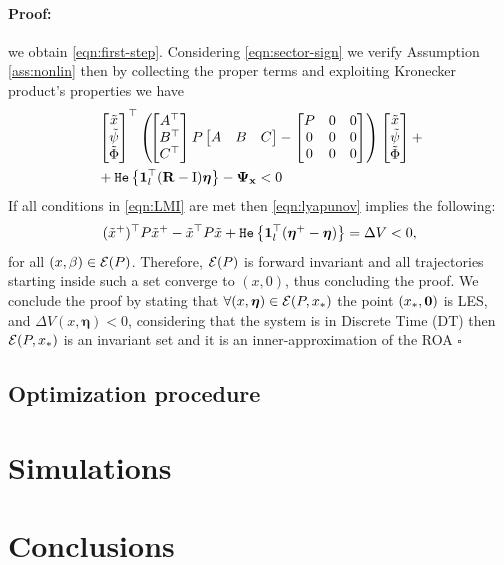 \documentclass{ifacconf}
\theoremstyle{plain}
\newenvironment{proof}{\paragraph*{Proof:}}{\hfill$\square$}
\begin{document}
\begin{proof}
we obtain \eqref{eqn:first-step}. Considering \eqref{eqn:sector-sign} we verify Assumption \ref{ass:nonlin} then by collecting the proper terms and exploiting Kronecker product's properties we have
\begin{equation}
\begin{aligned}
&\left[\begin{matrix}\tilde{x} \\ \tilde{\psi} \\ \tilde{\Phi}\end{matrix}\right]^\top \left( \!
  \left[\begin{matrix}\relax{A}^\top\\
  \relax{B}^\top\\
  C^\top
  \end{matrix}\right] P \left[\begin{matrix}\relax{A} & \relax{B} & C\end{matrix}\right] - \left[\begin{matrix}
  P & 0 & 0\\
  0 & 0 & 0\\
  0 & 0 & 0
  \end{matrix}\right] \right) \left[\begin{matrix}\tilde{x} \\ \tilde{\psi} \\ \tilde{\Phi}\end{matrix}\right] + \\
  &+ \texttt{\relax{He}}\left\{{\operatorname{\mathbf{1}}_l^\top ({\bf{R}} - \operatorname{I}) \boldsymbol{\eta}}\right\} - \mathbf{\Psi_x} < 0\\
\end{aligned}
\end{equation}
If all conditions in \eqref{eqn:LMI} are met then \eqref{eqn:lyapunov} implies the following:
\begin{equation}
    (\tilde{x}^+)^{\top} P \tilde{x}^+ - \tilde{x}^\top P \tilde{x} + \texttt{\relax{He}}\left\{{\operatorname{\mathbf{1}}_l^\top (\boldsymbol{\eta}^+ - \boldsymbol{\eta})}\right\} = \Delta V < 0, 
\end{equation}
{\color{blue} for all $(x, \beta)\in {\mathcal{E}}(P)$. Therefore, ${\mathcal{E}}(P)$ is forward invariant and all trajectories starting inside such a set converge to $(x,0)$, thus concluding the proof.}
We conclude the proof by stating that $\forall (x, \boldsymbol{\eta}) \in {\mathcal{E}}(P, x_*)$ the point $(x_*, \operatorname{\mathbf{0}})$ is LES, and $\Delta V(x, \boldsymbol{\eta}) < 0$, considering that the system is in Discrete Time (DT) then ${\mathcal{E}}(P, x_*)$ is an invariant set and it is an inner-approximation of the ROA
\end{proof}
\subsection{Optimization procedure}

\section{Simulations}

\section{Conclusions}

%

\end{document}
